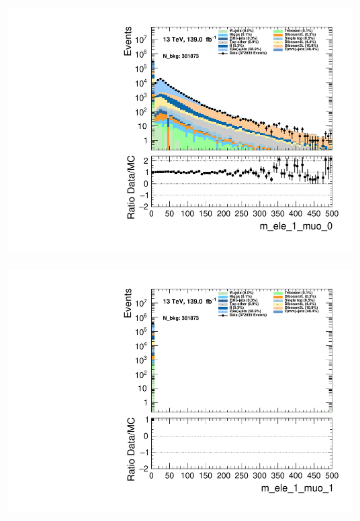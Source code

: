 \begin{figure}
    \centering
    \begin{subfigure}{.49\textwidth}
        \includegraphics[width=\textwidth]{Figures/MC_Data_comp/m_ele_1_muo_0.pdf}
        \caption{}
        \label{fig:et}
    \end{subfigure}
    \hfill
    \begin{subfigure}{.49\textwidth}
        \includegraphics[width=\textwidth]{Figures/MC_Data_comp/m_ele_1_muo_1.pdf}
        \caption{ }
        \label{fig:flcp}
    \end{subfigure}
    \hfill 
    \begin{subfigure}{.49\textwidth}

\end{subfigure}
\end{figure}
